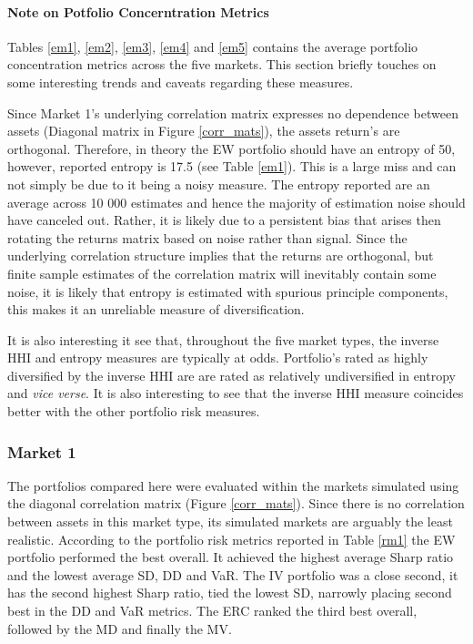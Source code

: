 \documentclass[11pt,preprint, authoryear]{elsarticle}
\numberwithin{equation}{section}
\numberwithin{figure}{section}
\numberwithin{table}{section}
\begin{document}
\hypertarget{note-on-potfolio-concerntration-metrics}{%
\paragraph{Note on Potfolio Concerntration
Metrics}\label{note-on-potfolio-concerntration-metrics}}

Tables \ref{em1}, \ref{em2}, \ref{em3}, \ref{em4} and \ref{em5} contains
the average portfolio concentration metrics across the five markets.
This section briefly touches on some interesting trends and caveats
regarding these measures.

Since Market 1's underlying correlation matrix expresses no dependence
between assets (Diagonal matrix in Figure \ref{corr_mats}), the assets
return's are orthogonal. Therefore, in theory the EW portfolio should
have an entropy of 50, however, reported entropy is 17.5 (see Table
\ref{em1}). This is a large miss and can not simply be due to it being a
noisy measure. The entropy reported are an average across 10 000
estimates and hence the majority of estimation noise should have
canceled out. Rather, it is likely due to a persistent bias that arises
then rotating the returns matrix based on noise rather than signal.
Since the underlying correlation structure implies that the returns are
orthogonal, but finite sample estimates of the correlation matrix will
inevitably contain some noise, it is likely that entropy is estimated
with spurious principle components, this makes it an unreliable measure
of diversification.

It is also interesting it see that, throughout the five market types,
the inverse HHI and entropy measures are typically at odds. Portfolio's
rated as highly diversified by the inverse HHI are are rated as
relatively undiversified in entropy and \emph{vice verse}. It is also
interesting to see that the inverse HHI measure coincides better with
the other portfolio risk measures.

\hypertarget{market-1}{%
\subsubsection{Market 1}\label{market-1}}

The portfolios compared here were evaluated within the markets simulated
using the diagonal correlation matrix (Figure \ref{corr_mats}). Since
there is no correlation between assets in this market type, its
simulated markets are arguably the least realistic. According to the
portfolio risk metrics reported in Table \ref{rm1} the EW portfolio
performed the best overall. It achieved the highest average Sharp ratio
and the lowest average SD, DD and VaR. The IV portfolio was a close
second, it has the second highest Sharp ratio, tied the lowest SD,
narrowly placing second best in the DD and VaR metrics. The ERC ranked
the third best overall, followed by the MD and finally the MV.
\end{document}
